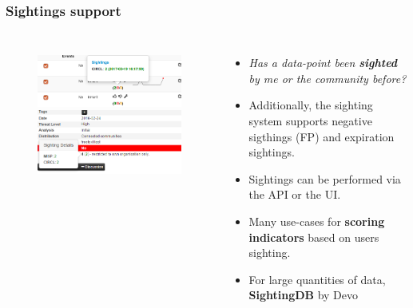 \begin{frame}
        \frametitle{Sightings support}
        \begin{columns}[t]
        \column{5.0cm}
        \begin{figure}
        \includegraphics[scale=0.3]{screenshots/sighting-n.png}\\
        \includegraphics[scale=0.34]{screenshots/Sightings2.PNG}
        \end{figure}
        \column{7cm}
        \begin{itemize}
                \item \textit{Has a data-point been {\bf sighted} by me or the community before?}
                \item Additionally, the sighting system supports negative sigthings (FP) and expiration sightings.
                \item Sightings can be performed via the API or the UI.
                \item Many use-cases for {\bf scoring indicators} based on users sighting.
                \item For large quantities of data, {\bf SightingDB} by Devo
        \end{itemize}
        \end{columns}
\end{frame}

